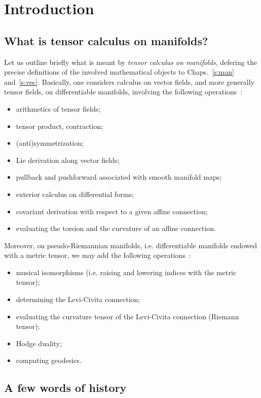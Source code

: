\chapter{Introduction} \label{s:int}

\minitoc

\section{What is tensor calculus on manifolds?}

Let us outline briefly what is meant by
\emph{tensor calculus on manifolds}, defering the precise definitions of the involved mathematical objects to Chaps.~\ref{s:man} and~\ref{s:vec}.
Basically, one considers calculus on vector fields,
and more generally tensor fields, on differentiable manifolds, involving the following operations~\cite{Lee13}:
\begin{itemize}
\item arithmetics of tensor fields;
\item tensor product, contraction;
\item (anti)symmetrization;
\item Lie derivation along vector fields;
\item pullback and pushforward associated with smooth manifold maps;
\item exterior calculus on differential forms;
\item covariant derivation with respect to a given affine connection;
\item evaluating the torsion and the curvature of an affine connection.
\end{itemize}
Moreover, on pseudo-Riemannian manifolds, i.e. differentiable manifolds endowed
with a metric tensor, we may add the following
operations~\cite{Lee97,ONeil83}:
\begin{itemize}
\item musical isomorphisms (i.e. raising and lowering indices with the metric tensor);
\item determining the Levi-Civita connection;
\item evaluating the curvature tensor of the Levi-Civita connection (Riemann tensor);
\item Hodge duality;
\item computing geodesics.
\end{itemize}


\section{A few words of history}

